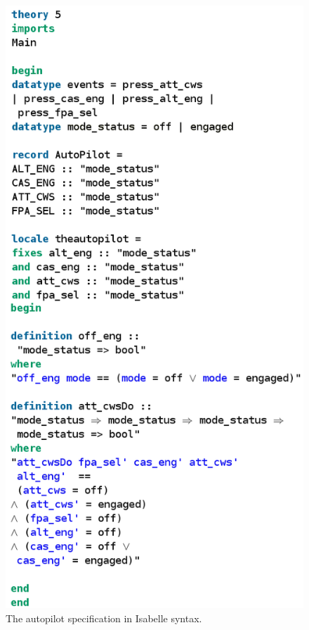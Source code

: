\begin{figure}[H]
\begin{minipage}{0.43\textwidth}
\includegraphics[clip, trim=0cm 0cm 4cm 0cm, scale=0.35]{examples/semiform/5imageal.png}
\vspace{-0.2in}
\caption{The autopilot specification in Isabelle syntax. \label{fig:autoisa}}
\vspace{-0.2in}
\end{minipage}
\end{figure}

